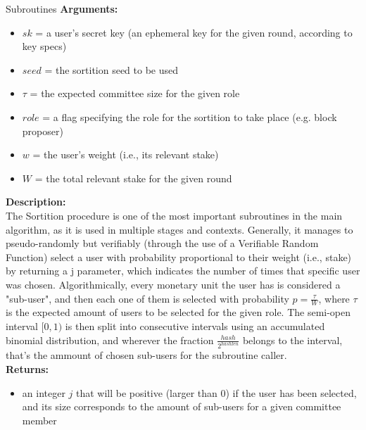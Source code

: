 \documentclass[10pt,a4paper]{article}
\begin{document}
\begin{section}{Subroutines}
\noindent \textbf{Arguments:}
\begin{itemize}
    \item $sk$ = a user's secret key (an ephemeral key for the given round, according to key specs)
    \item $seed$ = the sortition seed to be used
    \item $\tau$ = the expected committee size for the given role
    \item $role$ = a flag specifying the role for the sortition to take place (e.g. block proposer)
    \item $w$ = the user's weight (i.e., its relevant stake)
    \item $W$ = the total relevant stake for the given round
\end{itemize}

\noindent \textbf{Description:}\\
The Sortition procedure is one of the most important subroutines in the main algorithm, as it is 
used in multiple stages and contexts.
Generally, it manages to pseudo-randomly but verifiably (through the use of a Verifiable Random 
Function) select a user with probability proportional
to their weight (i.e., stake) by returning a j parameter, which indicates the number of times that 
specific user was chosen.
Algorithmically, every monetary unit the user has is considered a "sub-user", and then each one 
of them is selected with probability $p = \frac{\tau}{W}$,
where $\tau$ is the expected amount of users to be selected for the given role.
The semi-open interval $[0,1)$ is then split into consecutive intervals using an accumulated 
binomial distribution, and wherever the fraction $\frac{hash}{2^{hashlen}}$
belongs to the interval, that's the ammount of chosen sub-users for the subroutine caller.\\

\noindent \textbf{Returns:}
\begin{itemize}
    \item an integer $j$ that will be positive (larger than 0) if the user has been selected, 
    and its size corresponds to the amount of sub-users for a given committee member
  \end{itemize}


\begin{algorithm}[H]
    \begin{algorithmic}[1]


\end{algorithmic}
\end{algorithm}
\end{section}
\end{document}
